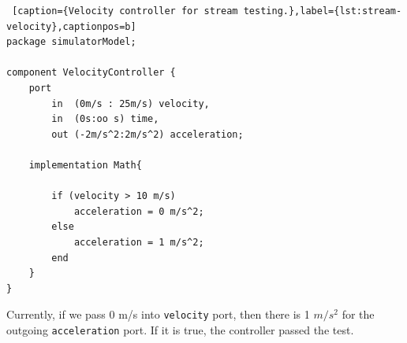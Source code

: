 \bigskip
\begin{lstlisting} [caption={Velocity controller for stream testing.},label={lst:stream-velocity},captionpos=b]
package simulatorModel;

component VelocityController {
    port
        in  (0m/s : 25m/s) velocity,
        in  (0s:oo s) time,
        out (-2m/s^2:2m/s^2) acceleration;

    implementation Math{

        if (velocity > 10 m/s)
            acceleration = 0 m/s^2;
        else
            acceleration = 1 m/s^2;
        end
    }
}    
\end{lstlisting}
\bigskip
Currently, if we pass 0 m/s into \texttt{velocity} port, then there is 1 $m/s^2$ for the outgoing \texttt{acceleration} port. If it is true, the controller passed the test.

